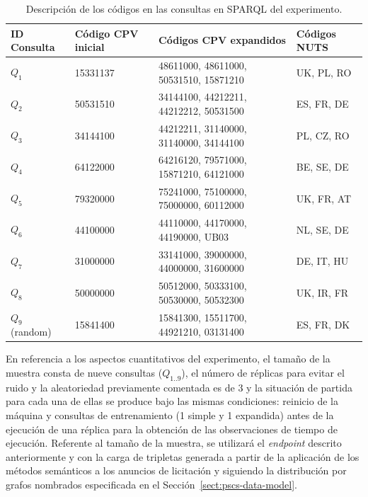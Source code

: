 \documentclass[a4paper,final,11pt,fleqn,twoside]{book}  %
\begin{document}
\begin{table}[!ht]
\renewcommand{\arraystretch}{1.3}
\begin{center}
\begin{tabular}{|p{3cm}|p{2.5cm}|p{3.5cm}|p{3.5cm}|}
\hline
  \textbf{ID Consulta} & \textbf{Código CPV inicial} & \textbf{Códigos CPV expandidos} & \textbf{Códigos NUTS}  \\ \hline
  $Q_1$ & 15331137 & 48611000, 48611000, 50531510, 15871210 & UK, PL, RO \\ \hline
  $Q_2$ & 50531510 & 34144100, 44212211, 44212212, 50531500 & ES, FR, DE \\ \hline
  $Q_3$ & 34144100 & 44212211, 31140000, 31140000, 34144100 & PL, CZ, RO \\ \hline
  $Q_4$ & 64122000 & 64216120, 79571000, 15871210, 64121000 & BE, SE, DE \\ \hline
  $Q_5$ & 79320000 & 75241000, 75100000, 75000000, 60112000 & UK, FR, AT \\ \hline
  $Q_6$ & 44100000 & 44110000, 44170000, 44190000, UB03 & NL, SE, DE \\ \hline
  $Q_7$ & 31000000 & 33141000, 39000000, 44000000, 31600000 & DE, IT, HU \\ \hline
  $Q_8$ & 50000000 & 50512000, 50333100, 50530000, 50532300 & UK, IR, FR \\ \hline
  $Q_9$ (random)   & 15841400 & 15841300, 15511700, 44921210, 03131400 & ES, FR, DK \\ \hline
  \hline
  \end{tabular}
  \caption{Descripción de los códigos en las consultas en SPARQL del experimento.}
  \label{tabla:queries}
  \end{center}
\end{table} 


En referencia a los aspectos cuantitativos del experimento, el tamaño de la muestra consta de nueve consultas ($Q_{1..9}$), el número de réplicas 
para evitar el ruido y la aleatoriedad previamente comentada es de $3$ y la situación de partida para cada una de ellas se produce 
bajo las mismas condiciones: reinicio de la máquina y consultas de entrenamiento (1 simple y 1 expandida) antes de la ejecución de una réplica para la obtención 
de las observaciones de tiempo de ejecución. Referente al tamaño de la muestra, se utilizará el \textit{endpoint} descrito anteriormente y con la carga 
de tripletas generada a partir de la aplicación de los métodos semánticos a los anuncios de licitación y siguiendo la distribución por 
grafos nombrados especificada en el Sección~\ref{sect:pscs-data-model}.
\end{document}
